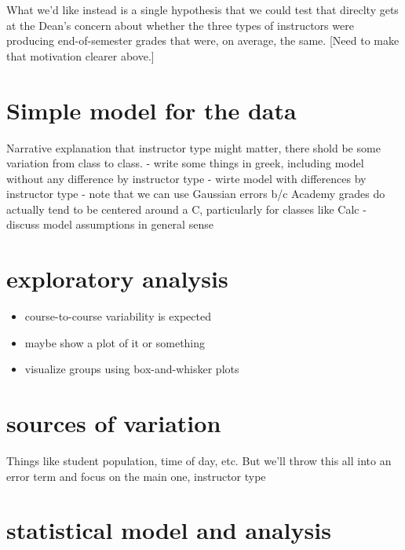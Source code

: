\documentclass[
]{book}
\providecommand{\tightlist}{%
  \setlength{\itemsep}{0pt}\setlength{\parskip}{0pt}}
\theoremstyle{definition}
\theoremstyle{definition}
\theoremstyle{definition}
\theoremstyle{remark}
\begin{document}
What we'd like instead is a single hypothesis that we could test that direclty gets at the Dean's concern about whether the three types of instructors were producing end-of-semester grades that were, on average, the same. {[}Need to make that motivation clearer above.{]}

\hypertarget{simple-model-for-the-data}{%
\chapter{Simple model for the data}\label{simple-model-for-the-data}}

Narrative explanation that instructor type might matter, there shold be some variation from class to class.
- write some things in greek, including model without any difference by instructor type
- wirte model with differences by instructor type
- note that we can use Gaussian errors b/c Academy grades do actually tend to be centered around a C, particularly for classes like Calc
- discuss model assumptions in general sense

\hypertarget{exploratory-analysis}{%
\chapter{exploratory analysis}\label{exploratory-analysis}}

\begin{itemize}
\tightlist
\item
  course-to-course variability is expected
\item
  maybe show a plot of it or something
\item
  visualize groups using box-and-whisker plots
\end{itemize}

\hypertarget{sources-of-variation}{%
\chapter{sources of variation}\label{sources-of-variation}}

Things like student population, time of day, etc. But we'll throw this all into an error term and focus on the main one, instructor type

\hypertarget{statistical-model-and-analysis}{%
\chapter{statistical model and analysis}\label{statistical-model-and-analysis}}
\end{document}
